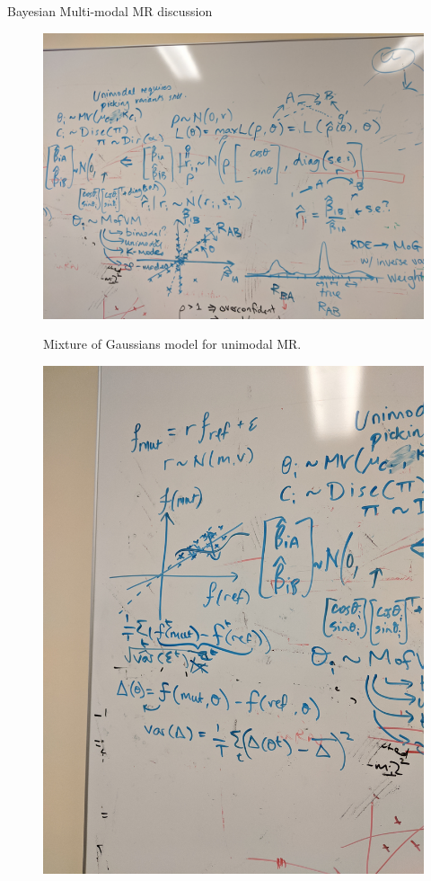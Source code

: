 \begin{Minutes}{Bayesian Multi-modal MR discussion}
\begin{figure}[htp]
    \includegraphics[width=.9\textwidth]{figures/whiteboard_20200226_2}
    \label{fig:2}
    \caption{Mixture of Gaussians model for unimodal MR.}
\end{figure}
\begin{figure}[h]
    \includegraphics[width=.9\textwidth]{figures/whiteboard_20200226_3}

\end{figure}
\end{Minutes}
